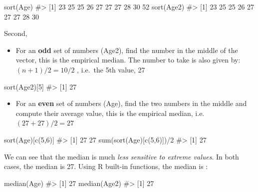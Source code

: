 \documentclass[
  letterpaper,
  DIV=11,
  numbers=noendperiod]{scrreprt}
\newenvironment{Shaded}{\begin{snugshade}}{\end{snugshade}}
\newcommand{\CommentTok}[1]{\textcolor[rgb]{0.37,0.37,0.37}{#1}}
\newcommand{\DecValTok}[1]{\textcolor[rgb]{0.68,0.00,0.00}{#1}}
\newcommand{\FunctionTok}[1]{\textcolor[rgb]{0.28,0.35,0.67}{#1}}
\newcommand{\NormalTok}[1]{\textcolor[rgb]{0.00,0.23,0.31}{#1}}
\newcommand{\SpecialCharTok}[1]{\textcolor[rgb]{0.37,0.37,0.37}{#1}}
\providecommand{\tightlist}{%
  \setlength{\itemsep}{0pt}\setlength{\parskip}{0pt}}\usepackage{longtable,booktabs,array}
\begin{document}
\begin{Shaded}
\begin{Highlighting}[]
\FunctionTok{sort}\NormalTok{(Age)}
\CommentTok{\#\textgreater{}  [1] 23 25 25 26 27 27 27 28 30 52}
\FunctionTok{sort}\NormalTok{(Age2)}
\CommentTok{\#\textgreater{} [1] 23 25 25 26 27 27 27 28 30}
\end{Highlighting}
\end{Shaded}

Second,

\begin{itemize}
\tightlist
\item
  For an \textbf{odd} set of numbers (Age2), find the number in the
  middle of the vector, this is the empirical median. The number to take
  is also given by: \((n + 1) / 2 = 10 / 2\) , i.e.~the 5th value, 27
\end{itemize}

\begin{Shaded}
\begin{Highlighting}[]
\FunctionTok{sort}\NormalTok{(Age2)[}\DecValTok{5}\NormalTok{]}
\CommentTok{\#\textgreater{} [1] 27}
\end{Highlighting}
\end{Shaded}

\begin{itemize}
\tightlist
\item
  For an \textbf{even} set of numbers (Age), find the two numbers in the
  middle and compute their average value, this is the empirical median,
  i.e.~\((27 + 27) / 2 = 27\)
\end{itemize}

\begin{Shaded}
\begin{Highlighting}[]
\FunctionTok{sort}\NormalTok{(Age)[}\FunctionTok{c}\NormalTok{(}\DecValTok{5}\NormalTok{,}\DecValTok{6}\NormalTok{)]}
\CommentTok{\#\textgreater{} [1] 27 27}
\FunctionTok{sum}\NormalTok{(}\FunctionTok{sort}\NormalTok{(Age)[}\FunctionTok{c}\NormalTok{(}\DecValTok{5}\NormalTok{,}\DecValTok{6}\NormalTok{)])}\SpecialCharTok{/}\DecValTok{2}
\CommentTok{\#\textgreater{} [1] 27}
\end{Highlighting}
\end{Shaded}

We can see that the median is much \emph{less sensitive to extreme
values}. In both cases, the median is 27. Using R built-in functions,
the median is :

\begin{Shaded}
\begin{Highlighting}[]
\FunctionTok{median}\NormalTok{(Age)}
\CommentTok{\#\textgreater{} [1] 27}
\FunctionTok{median}\NormalTok{(Age2)}
\CommentTok{\#\textgreater{} [1] 27}
\end{Highlighting}
\end{Shaded}
\end{document}
